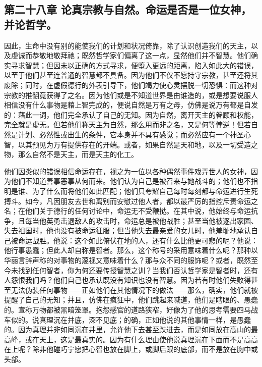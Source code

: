 
\subsection{第二十八章 论真宗教与自然。命运是否是一位女神，并论哲学。}

因此，生命中没有别的能使我们的计划和状况倚靠，除了认识创造我们的天主，以及虔诚而恭敬地敬拜祂；既然哲学家们偏离了这一点，显然他们并不智慧。他们确实寻求智慧；但因未以正确的方式寻求，便堕入更远的距离，陷入如此大的错误，以至于他们甚至连普通的智慧都不具备。因为他们不仅不愿持守宗教，甚至还将其废除；同时，在虚假德行的外表引导下，他们竭力使心灵摆脱一切恐惧：而这种对宗教的推翻竟获得了之名。因为他们或是不知道世界是由谁造的，或是想要说服人相信没有什么事物是藉上智完成的，便说自然是万有之母，仿佛是说万有都是自发的：藉此一词，他们完全承认了自己的无知。因为自然，离开天主的眷顾和权能，完全就是虚无。但若他们称天主为自然，那么用而非之名，又是何等悖逆！但若自然是计划、必然性或出生的条件，它本身并不具有感觉；而必然应有一个神圣心智，以其预见为万有提供存在的开端。或者，如果自然是天和地，以及一切受造之物，那么自然不是天主，而是天主的化工。\par

他们因类似的错误相信命运存在，视之为一位以各种偶然事件戏弄世人的女神，因为他们不知道善事恶事从何而来。他们认为自己是被召来与她战斗的；他们也不指明是谁、为了什么而将他们如此匹配；他们只夸耀自己每时每刻都与命运进行生死搏斗。如今，凡因朋友去世和离别而安慰过他人者，都以最严厉的指控斥责命运之名；在他们关于德行的任何讨论中，命运无不受鞭挞。在其中说，他始终与命运抗争，且每当他英勇击退敌人的攻击时，命运总是被他战胜；甚至当他被逐出家园、失去祖国时，他也没有被命运征服；但当他失去最亲爱的女儿时，他羞耻地承认自己被命运战胜。他说：这个如此俯伏在地的人，还有什么比他更可悲的呢？他说：他行事愚蠢；但此人却自称是智者。那么，这个称号的采用意味着什么呢？那种以华丽言辞声称的对事物的蔑视又意味着什么？那与众不同的服饰呢？或者，既然至今未找到任何智者，你为何还要传授智慧之训？当我们否认哲学家是智者时，还有人怨恨我们吗？他们自己也承认既没有知识也没有智慧。因为若有时他们失败得甚至无法伪装任何事物——正如他们在其他情况下的做法——那么，确实，他们就被提醒了自己的无知；并且，仿佛在疯狂中，他们跳起来喊道，他们是瞎眼的、愚蠢的。宣称万物都被黑暗笼罩。抱怨感官的道路狭窄，好像为了他的思考需要四马战车似的。说真理沉在井底，深不见底；的确，正如他说的其他事情一样，是愚蠢的。因为真理并非如同沉在井里，允许他下去甚至跌进去，而是如同放在高山的最高峰，或在天上，这是最真实的。因为有什么理由使他说真理沉在下面而不是高高在上呢？除非他碰巧宁愿把心智也放在脚上，或脚后跟的底部，而不是放在胸中或头部。\par

